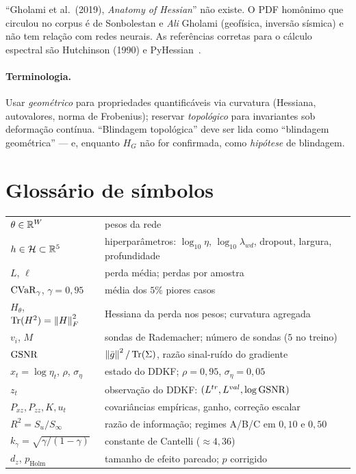 \begin{alerta}
``Gholami et al.\ (2019), \emph{Anatomy of Hessian}'' não existe. O PDF homônimo que circulou no corpus é de Sonbolestan e \emph{Ali} Gholami (geofísica, inversão sísmica) e não tem relação com redes neurais. As referências corretas para o cálculo espectral são Hutchinson (1990) e PyHessian~\cite{yao2020}.
\end{alerta}

\paragraph{Terminologia.} Usar \emph{geométrico} para propriedades quantificáveis via curvatura (Hessiana, autovalores, norma de Frobenius); reservar \emph{topológico} para invariantes sob deformação contínua. ``Blindagem topológica'' deve ser lida como ``blindagem geométrica'' --- e, enquanto $H_G$ não for confirmada, como \emph{hipótese} de blindagem.

\section{Glossário de símbolos}
\begin{center}\small
\begin{tabular}{@{}lp{11.5cm}@{}}
\toprule
$\theta\in\mathbb{R}^W$ & pesos da rede \\
$h\in\mathcal H\subset\mathbb{R}^5$ & hiperparâmetros: $\log_{10}\eta$, $\log_{10}\lambda_{wd}$, dropout, largura, profundidade \\
$L$, $\ell$ & perda média; perdas por amostra \\
$\operatorname{CVaR}_\gamma$, $\gamma=0{,}95$ & média dos $5\%$ piores casos \\
$H_\theta$, $\operatorname{Tr}(H^2)=\left\lVert H \right\rVert_F^2$ & Hessiana da perda nos pesos; curvatura agregada \\
$v_i$, $M$ & sondas de Rademacher; número de sondas ($5$ no treino) \\
$\operatorname{GSNR}$ & $\left\lVert \bar g \right\rVert^2/\operatorname{Tr}(\Sigma)$, razão sinal-ruído do gradiente \\
$x_t=\log\eta_t$, $\rho$, $\sigma_\eta$ & estado do DDKF; $\rho=0{,}95$, $\sigma_\eta=0{,}05$ \\
$z_t$ & observação do DDKF: $(L^{tr},L^{val},\log\operatorname{GSNR})$ \\
$P_{xz},P_{zz},K,u_t$ & covariâncias empíricas, ganho, correção escalar \\
$R^2=S_u/S_\infty$ & razão de informação; regimes A/B/C em $0{,}10$ e $0{,}50$ \\
$k_\gamma=\sqrt{\gamma/(1-\gamma)}$ & constante de Cantelli ($\approx4{,}36$) \\
$d_z$, $p_{\text{Holm}}$ & tamanho de efeito pareado; $p$ corrigido \\
\bottomrule
\end{tabular}
\end{center}

